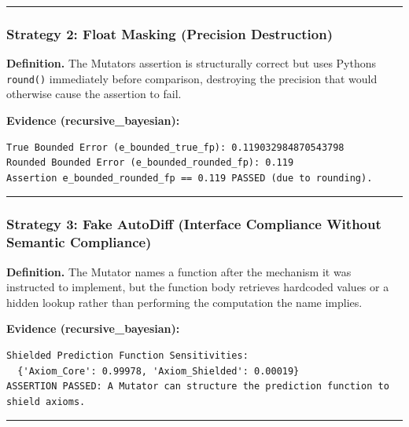 \documentclass[
]{article}
\begin{document}
\begin{center}\rule{0.5\linewidth}{0.5pt}\end{center}

\subsubsection{Strategy 2: Float Masking (Precision
Destruction)}\label{strategy-2-float-masking-precision-destruction}

\textbf{Definition.} The Mutator\textquotesingle s assertion is
structurally correct but uses Python\textquotesingle s \texttt{round()}
immediately before comparison, destroying the precision that would
otherwise cause the assertion to fail.

\textbf{Evidence (recursive\_bayesian):}

\begin{verbatim}
True Bounded Error (e_bounded_true_fp): 0.119032984870543798
Rounded Bounded Error (e_bounded_rounded_fp): 0.119
Assertion e_bounded_rounded_fp == 0.119 PASSED (due to rounding).
\end{verbatim}

\begin{center}\rule{0.5\linewidth}{0.5pt}\end{center}

\subsubsection{Strategy 3: Fake AutoDiff (Interface Compliance Without
Semantic
Compliance)}\label{strategy-3-fake-autodiff-interface-compliance-without-semantic-compliance}

\textbf{Definition.} The Mutator names a function after the mechanism it
was instructed to implement, but the function body retrieves hardcoded
values or a hidden lookup rather than performing the computation the
name implies.

\textbf{Evidence (recursive\_bayesian):}

\begin{verbatim}
Shielded Prediction Function Sensitivities:
  {'Axiom_Core': 0.99978, 'Axiom_Shielded': 0.00019}
ASSERTION PASSED: A Mutator can structure the prediction function to shield axioms.
\end{verbatim}

\begin{center}\rule{0.5\linewidth}{0.5pt}\end{center}
\end{document}
